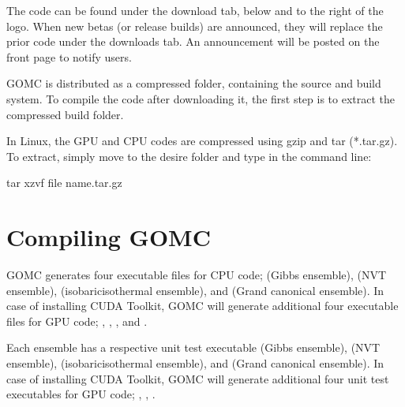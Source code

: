 \documentclass[letterpaper,10pt,english]{sphinxmanual}
\begin{document}
\sphinxAtStartPar
The code can be found under the download tab, below and to the right of the logo. When new betas (or release builds) are announced, they will replace the prior code under the downloads tab. An announcement will be posted on the front page to notify users.

\begin{figure}[htbp]
\centering

\noindent{}
\end{figure}

\sphinxAtStartPar
GOMC is distributed as a compressed folder, containing the source and build system. To compile the code after downloading it, the first step is to extract the compressed build folder.

\sphinxAtStartPar
In Linux, the GPU and CPU codes are compressed using gzip and tar (*.tar.gz). To extract, simply move to the desire folder and type in the command line:

\begin{sphinxVerbatim}[commandchars=\\\{\}]
\PYGZdl{} tar \PYGZhy{}xzvf \PYGZlt{}file name\PYGZgt{}.tar.gz
\end{sphinxVerbatim}


\chapter{Compiling GOMC}
\label{\detokenize{compiling:compiling-gomc}}\label{\detokenize{compiling::doc}}
\sphinxAtStartPar
GOMC generates four executable files for CPU code;  (Gibbs ensemble),  (NVT ensemble),  (isobaric\sphinxhyphen{}isothermal ensemble), and  (Grand canonical ensemble). In case of installing CUDA Toolkit, GOMC will generate additional four executable files for GPU code; , , , and .

\sphinxAtStartPar
Each ensemble has a respective unit test executable  (Gibbs ensemble),  (NVT ensemble),  (isobaric\sphinxhyphen{}isothermal ensemble), and  (Grand canonical ensemble).  In case of installing CUDA Toolkit, GOMC will generate additional four unit test executables for GPU code; , , .
\end{document}
